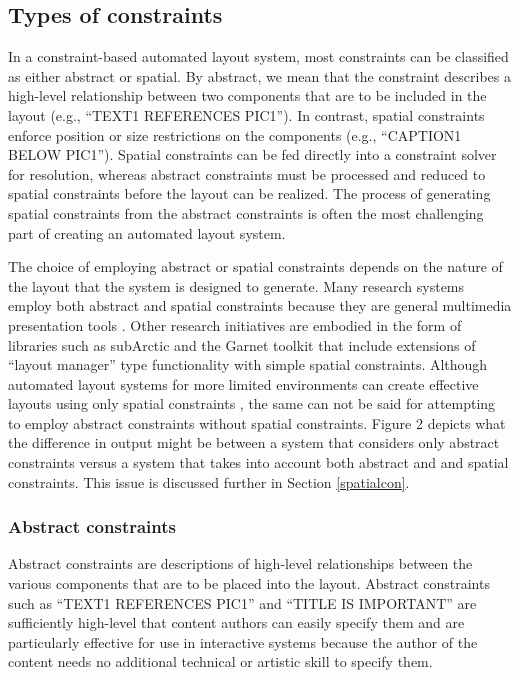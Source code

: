    \subsection{Types of constraints}

    In a constraint-based automated layout system, most constraints can be classified as either abstract or spatial. By abstract, we mean that the constraint describes a high-level relationship between two components that are to be included in the layout (e.g., “TEXT1 REFERENCES PIC1”). In contrast, spatial constraints enforce position or size restrictions on the components (e.g., “CAPTION1 BELOW PIC1”). Spatial constraints can be fed directly into a constraint solver for resolution, whereas abstract constraints must be processed and reduced to spatial constraints before the layout can be realized. The process of generating spatial constraints from the abstract constraints is often the most challenging part of creating an automated layout system.

    The choice of employing abstract or spatial constraints depends on the nature of the layout that the system is designed to generate. Many research systems employ both abstract and spatial constraints because they are general multimedia presentation tools \citep{feiner-1,weitzman-2,graf-1}. Other research initiatives are embodied in the form of libraries such as subArctic \citep{hudson-3,hudson-1} and the Garnet toolkit \citep{myers-2} that include extensions of “layout manager” type functionality with simple spatial constraints. Although automated layout systems for more limited environments can create effective layouts using only spatial constraints \citep{kosak-1}, the same can not be said for attempting to employ abstract constraints without spatial constraints. Figure 2 depicts what the difference in output might be between a system that considers only abstract constraints versus a system that takes into account both abstract and and spatial constraints. This issue is discussed further in Section \ref{spatialcon}.

    \subsubsection{Abstract constraints}

    Abstract constraints are descriptions of high-level relationships between the various components that are to be placed into the layout. Abstract constraints such as “TEXT1 REFERENCES PIC1” and “TITLE IS IMPORTANT” are sufficiently high-level that content authors can easily specify them and are particularly effective for use in interactive systems because the author of the content needs no additional technical or artistic skill to specify them.

